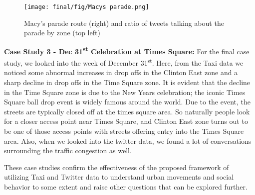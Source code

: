 \begin{figure}[h]
 \centering %
 \texttt{[image: final/fig/Macys parade.png]}
 \caption{Macy's parade route (right) and ratio of tweets talking about the parade by zone (top left)}
 \label{fig:macys}
\end{figure}

\textbf{Case Study 3 - Dec 31\textsuperscript{st} Celebration at Times Square: } For the final case study, we looked into the week of December 31\textsuperscript{st}. Here, from the Taxi data we noticed some abnormal increases in drop offs in the Clinton East zone and a sharp decline in drop offs in the Time Square zone. It is evident that the decline in the Time Square zone is due to the New Years celebration; the iconic Times Square ball drop event is widely famous around the world. Due to the event, the streets are typically closed off at the times square area. So naturally people look for a closer access point near Times Square, and Clinton East zone turns out to be one of those access points with streets offering entry into the Times Square area. Also, when we looked into the twitter data, we found a lot of conversations surrounding the traffic congestion as well.

These case studies confirm the effectiveness of the proposed framework of utilizing Taxi and Twitter data to understand urban movements and social behavior to some extent and raise other questions that can be explored further.
